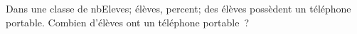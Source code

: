 \documentclass[exercice]{thedocument}%
\begin{document}
%
Dans une classe de \<nbEleves; élèves,
\<percent; des élèves possèdent un
téléphone portable.\vskip10pt Combien d'élèves ont un téléphone portable~?
\end{document}
